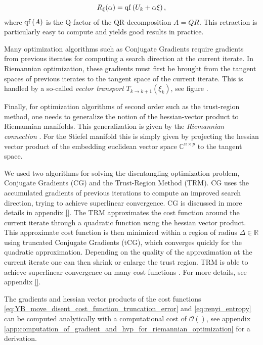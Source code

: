 \begin{equation}
	R_\xi(\alpha) = \operatorname{qf}\left(U_k + \alpha\xi\right),
\end{equation}
where $\operatorname{qf}\left(A\right)$ is the Q-factor of the QR-decomposition $A = QR$. This retraction is particularly easy to compute and yields good results in practice. \par
Many optimization algorithms such as Conjugate Gradients require gradients from previous iterates for computing a search direction at the current iterate. In Riemannian optimization, these gradients must first be brought from the tangent spaces of previous iterates to the tangent space of the current iterate. This is handled by a so-called \textit{vector transport} $T_{k\rightarrow k+1}\left(\xi_k\right)$, see figure . \par
Finally, for optimization algorithms of second order such as the trust-region method, one needs to generalize the notion of the hessian-vector product to Riemannian manifolds. This generalization is given by the \textit{Riemannian connection} \cite{cite:optimization_on_matrix_manifolds}. For the Stiefel manifold this is simply given by projecting the hessian vector product of the embedding euclidean vector space $\mathbb{C}^{n\times p}$ to the tangent space. \par
We used two algorithms for solving the disentangling optimization problem, Conjugate Gradients (CG) and the Trust-Region Method (TRM). CG uses the accumulated gradients of previous iterations to compute an improved search direction, trying to achieve superlinear convergence. CG is discussed in more details in appendix \ref{}. The TRM approximates the cost function around the current iterate through a quadratic function using the hessian vector product. This approximate cost function is then minimized within a region of radius $\Delta\in\mathbb{R}$ using truncated Conjugate Gradients (tCG), which converges quickly for the quadratic approximation. Depending on the quality of the approximation at the current iterate one can then shrink or enlarge the trust region. TRM is able to achieve superlinear convergence on many cost functions \cite{cite:optimization_on_matrix_manifolds}. For more details, see appendix \ref{}. \par
The gradients and hessian vector products of the cost functions \eqref{eq:YB_move_disent_cost_function_truncation_error} and \eqref{eq:renyi_entropy} can be computed analytically with a computational cost of $\mathcal{O}()$, see appendix \ref{app:computation_of_gradient_and_hvp_for_riemannian_optimization} for a derivation.
